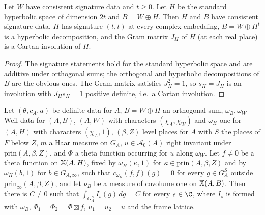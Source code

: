 \begin{lemma}\label{pf:liftinj:hypsum}
Let $W$ have consistent signature data and $t\ge0$. Let $H$ be the standard hyperbolic space of dimension $2t$ and $B=W\oplus H$. Then $H$ and $B$ have
consistent signature data, $H$ has signature $(t,t)$ at every complex embedding, $B=W\oplus H^t$ is a hyperbolic decomposition, and the Gram matrix
$J_H$ of $H$ (at each real place) is a Cartan involution of $H$.
\end{lemma}

\begin{proof}
The signature statements hold for the standard hyperbolic space and are additive under orthogonal sums; the orthogonal and hyperbolic decompositions
of $B$ are the obvious ones. The Gram matrix satisfies $J_H^2=1$, so $s_H=J_H$ is an involution with $J_Hs_H=1$ positive definite, i.e.\ a Cartan
involution.
\end{proof}

\begin{lemma}\label{pf:liftinj:levelconst}
Let $(\theta,c_A,a)$ be definite data for $A$, $B=W\oplus H$ an orthogonal sum, $\omega_B,\omega_W$ Weil data for $(A,B)$, $(A,W)$ with characters
$(\chi_A,\chi_W)$ and $\omega_H$ one for $(A,H)$ with characters $(\chi_A,1)$, $(\beta,Z)$ level places for $A$ with $S$ the places of $F$ below $Z$, $m$
a Haar measure on $G_A$, $u\in\mathcal A_0(A)$ right invariant under $\mathrm{prin}(A,\beta,Z)$, and $\Phi$ a theta function occurring for $u$ along
$\omega_W$. Let $f\ne0$ be a theta function on $\mathbb{X}(A,H)$, fixed by $\omega_H(\kappa,1)$ for $\kappa\in\mathrm{prin}(A,\beta,Z)$ and by $\omega_H(b,1)$ for
$b\in G_{A,\infty}$, such that $c_{\omega_H}(f,f)(g)=0$ for every $g\in G_A^S$ outside $\mathrm{prin}_\infty(A,\beta,Z)$, and let $\nu_B$ be a measure of
covolume one on $\mathbb{X}(A,B)$. Then there is $C\ne0$ such that $\int_{G_A^S}I_s(g)\,dg=C$ for every $s\in\C$, where $I_s$ is formed with
$\omega_B$, $\Phi_1=\Phi_2=\Phi\boxtimes f$, $u_1=u_2=u$ and the frame lattice.
\end{lemma}

